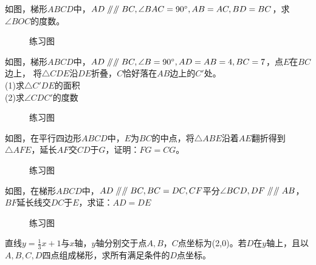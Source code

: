 \begin{problem}
如图，梯形$ABCD$中，$AD\mathrel{/\mkern-5mu/}\mathrel{/\mkern-5mu/} BC,\angle BAC=90^\circ,AB=AC,BD=BC$，求$\angle BOC$的度数。
\end{problem}
\begin{figure}[H]
    \centering
    \resizebox{4cm}{!}{}
    \caption{练习图}
\end{figure}
\begin{problem}
如图，梯形$ABCD$中，$AD\mathrel{/\mkern-5mu/}\mathrel{/\mkern-5mu/} BC,\angle B=90^\circ,AD=AB=4,BC=7$，点$E$在$BC$边上，
将$\triangle CDE$沿$DE$折叠，$C$恰好落在$AB$边上的$C'$处。 \\
(1)求$\triangle C'DE$的面积 \\
(2)求$\angle CDC'$的度数 \\
\end{problem}
\begin{figure}[H]
    \centering
    \resizebox{4cm}{!}{}
    \caption{练习图}
\end{figure}

\begin{problem}
如图，在平行四边形$ABCD$中，$E$为$BC$的中点，将$\triangle ABE$沿着$AE$翻折得到$\triangle AFE$，延长$AF$交$CD$于$G$，证明：$FG=CG$。 \\
\end{problem}
\begin{figure}[H]
    \centering
    \resizebox{4cm}{!}{}
    \caption{练习图}
\end{figure}

\begin{problem}
如图，在梯形$ABCD$中，$AD\mathrel{/\mkern-5mu/}\mathrel{/\mkern-5mu/} BC,BC=DC,CF$平分$\angle BCD,DF\mathrel{/\mkern-5mu/}\mathrel{/\mkern-5mu/} AB$，$BF$延长线交$DC$于$E$，求证：$AD=DE$\\
\end{problem}
\begin{figure}[H]
    \centering
    \resizebox{4cm}{!}{}
    \caption{练习图}
\end{figure}
\begin{problem}
直线$y=\frac{1}{3}x+1$与$x$轴，$y$轴分别交于点$A,B$，$C$点坐标为(2,0)。若$D$在$y$轴上，且以$A,B,C,D$四点组成梯形，求所有满足条件的$D$点坐标。
\end{problem}
\clearpage

